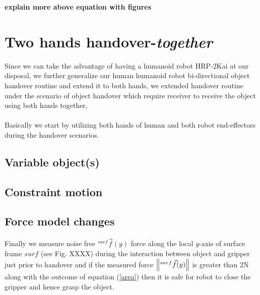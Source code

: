 \documentclass[a4paper, 12pt, oneside]{Thesis}  %
\begin{document}



{\bf explain more above equation with figures}


\clearpage

\section{Two hands handover-\textit{together}}\label{both hands together}

Since  we can take the advantage of having a humanoid robot HRP-2Kai at our disposal, we further generalize our human humanoid robot bi-directional object handover routine and extend it to both hands, we extended handover routine under the scenario of object handover which require receiver to receive the object using both hands together,

\paragraph*{}
Basically we start by utilizing both hands of human and both robot end-effectors during the handover scenarios. 

\subsection{Variable object(s)}

\subsection{Constraint motion}

\subsection{Force model changes}


Finally we measure noise free ${}^{surf}\vec{f}(y)$ force along the local $y$-axis of surface frame $surf$ (see Fig. XXXX) during the interaction between object and gripper just prior to handover and if the measured force $\norm{{}^{surf}\vec{f}(y)}$ is greater than 2N along with the outcome of equation (\ref{area}) then it is safe for robot to close the gripper and hence grasp the object.
\end{document}
